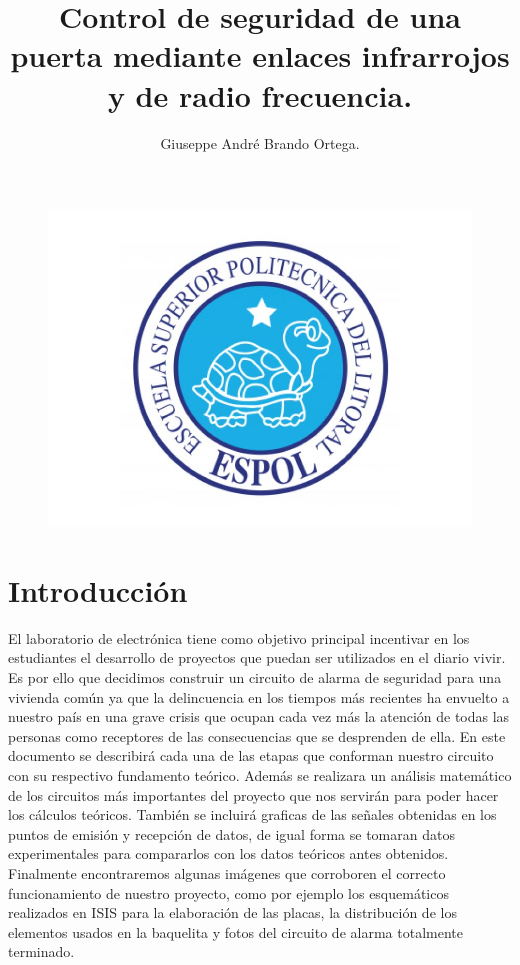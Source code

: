 \documentclass[a4paper,11pt]{article}
\begin{document}
\author{
	Giuseppe André Brando Ortega.
}
\title{Control de seguridad de una puerta mediante enlaces infrarrojos y de radio frecuencia.}
\maketitle
\begin{figure}[h]
\centering
	\includegraphics[width=0.7\linewidth]{./logo}
\end{figure}


\newpage

\section{Introducción}
El laboratorio de electrónica tiene como objetivo principal incentivar en los estudiantes el desarrollo de proyectos que puedan ser utilizados en el diario vivir. Es por ello que decidimos construir un circuito de alarma de seguridad para una vivienda común ya que la delincuencia en los tiempos más recientes ha envuelto a nuestro país en una grave crisis  que  ocupan  cada  vez  más   la  atención  de   todas   las  personas  como receptores de las consecuencias que se desprenden de ella. 
En este documento se describirá cada una de las etapas que conforman nuestro circuito con su respectivo fundamento teórico. Además se realizara un análisis matemático de los circuitos más importantes del proyecto que nos servirán para poder hacer los cálculos teóricos. 
También se incluirá graficas de las señales obtenidas en los puntos de emisión y recepción de datos, de igual forma se tomaran datos experimentales para compararlos con los datos teóricos antes obtenidos.
Finalmente encontraremos algunas imágenes que corroboren el correcto funcionamiento de nuestro proyecto, como por ejemplo los esquemáticos realizados en ISIS para la elaboración de las placas, la distribución de los elementos usados en la baquelita y fotos del circuito de alarma totalmente terminado.
\end{document}
